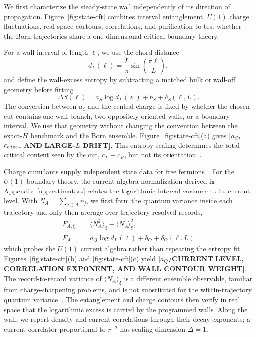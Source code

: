 \documentclass[aps,prx,twocolumn,superscriptaddress,longbibliography,nofootinbib,floatfix]{revtex4-2}
\newcommand{\ResultValue}[1]{\textcolor{BrickRed}{\textbf{[#1]}}}
\begin{document}
We first characterize the steady-state wall independently of its direction of propagation.  Figure~\ref{fig:state-cft} combines interval entanglement, $U(1)$ charge fluctuations, real-space contours, correlations, and purification to test whether the Born trajectories share a one-dimensional critical boundary theory.

For a wall interval of length $\ell$, we use the chord distance
\begin{equation}
 d_L(\ell)=\frac{L}{\pi}\sin\!\left(\frac{\pi\ell}{L}\right),
 \label{eq:chord}
\end{equation}
and define the wall-excess entropy by subtracting a matched bulk or wall-off geometry before fitting
\begin{equation}
 \Delta S(\ell)=a_S\log d_L(\ell)+b_S+\delta_S(\ell,L).
 \label{eq:entropy-fit}
\end{equation}
The conversion between $a_S$ and the central charge is fixed by whether the chosen cut contains one wall branch, two oppositely oriented walls, or a boundary interval.  We use that geometry without changing the convention between the exact-$H$ benchmark and the Born ensemble.  Figure~\ref{fig:state-cft}(a) gives \ResultValue{$a_S$, $c_{\rm edge}$, AND LARGE-$L$ DRIFT}.  This entropy scaling determines the total critical content seen by the cut, $c_L+c_R$, but not its orientation~\cite{ChenLiFisher2020,LiChenLudwig2021}.

Charge cumulants supply independent state data for free fermions~\cite{KlichLevitov2009,SongFlindtRachel2011}.  For the $U(1)$ boundary theory, the current-algebra normalization derived in Appendix~\ref{app:estimators} relates the logarithmic interval variance to its current level.  With $N_A=\sum_{j\in A}n_j$, we first form the quantum variance inside each trajectory and only then average over trajectory-resolved records,
\begin{align}
 F_{A,\xi}&=\big\langle N_A^2\big\rangle_\xi-\big\langle N_A\big\rangle_\xi^2,\nonumber
 \\
 \overline{F_A}&=a_Q\log d_L(\ell)+b_Q+\delta_Q(\ell,L)
\label{eq:charge-fit}
\end{align}
which probes the $U(1)$ current algebra rather than repeating the entropy fit.  Figures~\ref{fig:state-cft}(b) and \ref{fig:state-cft}(c) yield \ResultValue{$a_Q$/CURRENT LEVEL, CORRELATION EXPONENT, AND WALL CONTOUR WEIGHT}.  The record-to-record variance of $\langle N_A\rangle_\xi$ is a different ensemble observable, familiar from charge-sharpening problems, and is not substituted for the within-trajectory quantum variance~\cite{AgrawalZabaloChen2022,BarrattAgrawalGopalakrishnan2022}.  The entanglement and charge contours then verify in real space that the logarithmic excess is carried by the programmed walls.  Along the wall, we report density and current correlations through their decay exponents; a current correlator proportional to $r^{-2}$ has scaling dimension $\Delta=1$.
\end{document}
